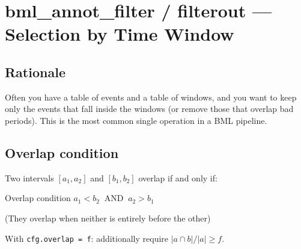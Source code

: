 \documentclass[11pt, a4paper]{article}
\begin{document}
\section{bml\_annot\_filter / filterout --- Selection by Time Window}
\label{sec:filter}

\subsection{Rationale}

Often you have a table of events and a table of windows, and you want to keep only the events that fall inside the windows (or remove those that overlap bad periods). This is the most common single operation in a BML pipeline.

\subsection{Overlap condition}

Two intervals $[a_1, a_2]$ and $[b_1, b_2]$ overlap if and only if:
\begin{formulabox}{Overlap condition}
$a_1 < b_2 \;\;\text{AND}\;\; a_2 > b_1$

(They overlap when neither is entirely before the other)
\end{formulabox}

With \texttt{cfg.overlap = f}: additionally require $|a \cap b| / |a| \geq f$.
\end{document}
